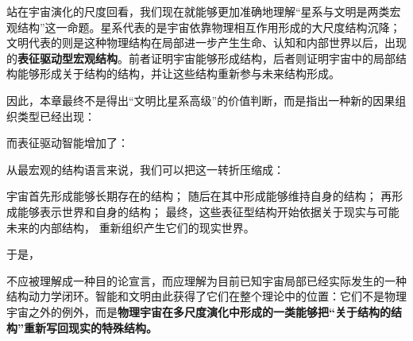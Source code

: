 站在宇宙演化的尺度回看，我们现在就能够更加准确地理解“星系与文明是两类宏观结构”这一命题。星系代表的是宇宙依靠物理相互作用形成的大尺度结构沉降；文明代表的则是这种物理结构在局部进一步产生生命、认知和内部世界以后，出现的\textbf{表征驱动型宏观结构}。前者证明宇宙能够形成结构，后者则证明宇宙中的局部结构能够形成关于结构的结构，并让这些结构重新参与未来结构形成。

因此，本章最终不是得出“文明比星系高级”的价值判断，而是指出一种新的因果组织类型已经出现：

\begin{statementbox}
\centering
{}
\end{statementbox}

而表征驱动智能增加了：

\begin{statementbox}
\centering
{}
\end{statementbox}

从最宏观的结构语言来说，我们可以把这一转折压缩成：

\begin{statementbox}
宇宙首先形成能够长期存在的结构；
随后在其中形成能够维持自身的结构；
再形成能够表示世界和自身的结构；
最终，这些表征型结构开始依据关于现实与可能未来的内部结构，
重新组织产生它们的现实世界。
\end{statementbox}

于是，
\begin{statementbox}
\centering
{}
\end{statementbox}
不应被理解成一种目的论宣言，而应理解为目前已知宇宙局部已经实际发生的一种结构动力学闭环。智能和文明由此获得了它们在整个理论中的位置：它们不是物理宇宙之外的例外，而是\textbf{物理宇宙在多尺度演化中形成的一类能够把“关于结构的结构”重新写回现实的特殊结构。}
